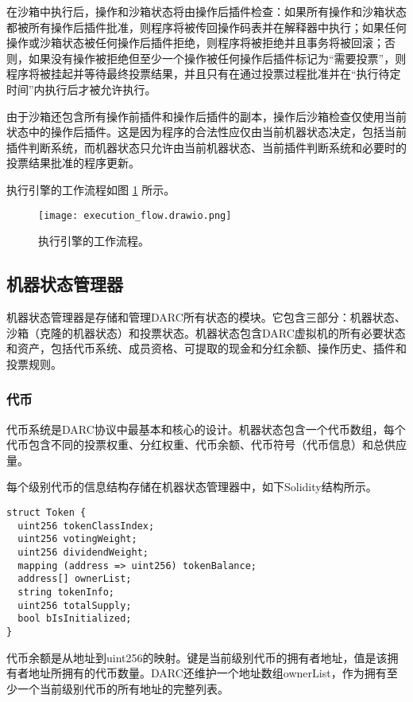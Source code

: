 \documentclass[main.tex]{subfiles}
\begin{document}
在沙箱中执行后，操作和沙箱状态将由操作后插件检查：如果所有操作和沙箱状态都被所有操作后插件批准，则程序将被传回操作码表并在解释器中执行；如果任何操作或沙箱状态被任何操作后插件拒绝，则程序将被拒绝并且事务将被回滚；否则，如果没有操作被拒绝但至少一个操作被任何操作后插件标记为“需要投票”，则程序将被挂起并等待最终投票结果，并且只有在通过投票过程批准并在“执行待定时间”内执行后才被允许执行。

由于沙箱还包含所有操作前插件和操作后插件的副本，操作后沙箱检查仅使用当前状态中的操作后插件。这是因为程序的合法性应仅由当前机器状态决定，包括当前插件判断系统，而机器状态只允许由当前机器状态、当前插件判断系统和必要时的投票结果批准的程序更新。

执行引擎的工作流程如图 \ref{fig:workflow} 所示。

\begin{figure}
\centering
\texttt{[image: execution\_flow.drawio.png]}
\caption{\label{fig:workflow}执行引擎的工作流程。}
\end{figure}

\subsection{机器状态管理器}

机器状态管理器是存储和管理DARC所有状态的模块。它包含三部分：机器状态、沙箱（克隆的机器状态）和投票状态。机器状态包含DARC虚拟机的所有必要状态和资产，包括代币系统、成员资格、可提取的现金和分红余额、操作历史、插件和投票规则。

\subsubsection{代币}

代币系统是DARC协议中最基本和核心的设计。机器状态包含一个代币数组，每个代币包含不同的投票权重、分红权重、代币余额、代币符号（代币信息）和总供应量。

每个级别代币的信息结构存储在机器状态管理器中，如下Solidity结构所示。

\begin{verbatim}
struct Token {
  uint256 tokenClassIndex;
  uint256 votingWeight;
  uint256 dividendWeight;
  mapping (address => uint256) tokenBalance;
  address[] ownerList;
  string tokenInfo;
  uint256 totalSupply;
  bool bIsInitialized;
}
\end{verbatim}

代币余额是从地址到uint256的映射。键是当前级别代币的拥有者地址，值是该拥有者地址所拥有的代币数量。DARC还维护一个地址数组ownerList，作为拥有至少一个当前级别代币的所有地址的完整列表。
\end{document}

